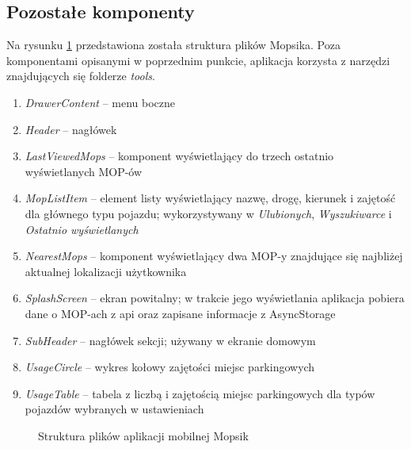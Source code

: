 \subsection{Pozostałe komponenty}
Na rysunku \ref{mopsik_mobile_structure} przedstawiona została struktura plików Mopsika. Poza komponentami opisanymi w poprzednim punkcie, aplikacja korzysta z narzędzi znajdujących się folderze \textit{tools}.
\begin{enumerate}
\item \textit{DrawerContent} -- menu boczne
\item \textit{Header} -- nagłówek
\item \textit{LastViewedMops} -- komponent wyświetlający do trzech ostatnio wyświetlanych MOP-ów
\item \textit{MopListItem} -- element listy wyświetlający nazwę, drogę, kierunek i zajętość dla głównego typu pojazdu; wykorzystywany w \textit{Ulubionych}, \textit{Wyszukiwarce} i \textit{Ostatnio wyświetlanych}
\item \textit{NearestMops} -- komponent wyświetlający dwa MOP-y znajdujące się najbliżej aktualnej lokalizacji użytkownika
\item \textit{SplashScreen} -- ekran powitalny; w trakcie jego wyświetlania aplikacja pobiera dane o MOP-ach z api oraz zapisane informacje z AsyncStorage
\item \textit{SubHeader} -- nagłówek sekcji; używany w ekranie domowym
\item \textit{UsageCircle} -- wykres kołowy zajętości miejsc parkingowych
\item \textit{UsageTable} -- tabela z liczbą i zajętością miejsc parkingowych dla typów pojazdów wybranych w ustawieniach
\end{enumerate}
\begin{figure}[!htb]
\caption{Struktura plików aplikacji mobilnej Mopsik}
\label{mopsik_mobile_structure}
\end{figure}



